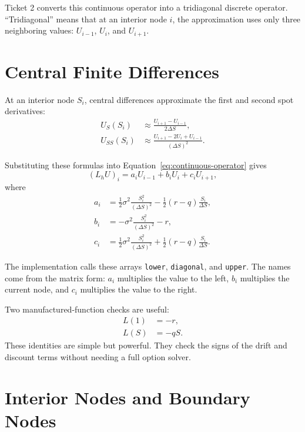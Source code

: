 \documentclass[11pt,a4paper]{article}
\newcommand{\code}[1]{\texttt{#1}}
\begin{document}
Ticket 2 converts this continuous operator into a tridiagonal discrete operator. ``Tridiagonal''
means that at an interior node \(i\), the approximation uses only three neighboring values:
\(U_{i-1}\), \(U_i\), and \(U_{i+1}\).

\section{Central Finite Differences}

At an interior node \(S_i\), central differences approximate the first and second spot
derivatives:
\begin{align}
  U_S(S_i) &\approx \frac{U_{i+1} - U_{i-1}}{2\Delta S}, \\
  U_{SS}(S_i) &\approx \frac{U_{i+1} - 2U_i + U_{i-1}}{(\Delta S)^2}.
\end{align}

Substituting these formulas into Equation~\ref{eq:continuous-operator} gives
\begin{equation}
  (L_h U)_i = a_i U_{i-1} + b_i U_i + c_i U_{i+1},
\end{equation}
where
\begin{align}
  a_i &=
    \frac{1}{2}\sigma^2\frac{S_i^2}{(\Delta S)^2}
    - \frac{1}{2}(r-q)\frac{S_i}{\Delta S}, \\
  b_i &=
    -\sigma^2\frac{S_i^2}{(\Delta S)^2}
    - r, \\
  c_i &=
    \frac{1}{2}\sigma^2\frac{S_i^2}{(\Delta S)^2}
    + \frac{1}{2}(r-q)\frac{S_i}{\Delta S}.
\end{align}

The implementation calls these arrays \code{lower}, \code{diagonal}, and \code{upper}. The names
come from the matrix form: \(a_i\) multiplies the value to the left, \(b_i\) multiplies the
current node, and \(c_i\) multiplies the value to the right.

Two manufactured-function checks are useful:
\begin{align}
  L(1) &= -r, \\
  L(S) &= -qS.
\end{align}
These identities are simple but powerful. They check the signs of the drift and discount terms
without needing a full option solver.

\section{Interior Nodes and Boundary Nodes}
\end{document}
